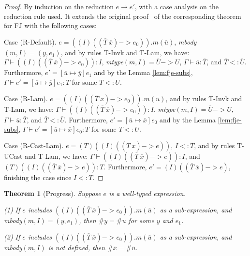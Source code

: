 \documentclass[tese,capa,english]{texufpel}
\newtheorem{theorem}{Theorem}
\begin{document}
\begin{proof}
By induction on the reduction $e \rightarrow e'$, with a case analysis on the reduction rule used. It extends the original proof~\cite{Igarashi:2001:FJM:503502.503505} of the corresponding theorem for FJ with the following cases:

\vspace{5pt}

Case (R-Default). $e = ((I)((\overline{T} ~ \overline{x}) -> e_0)).m(\overline{u})$, \emph{mbody}$(m, I) = (\overline{y}, e_1)$, and by rules {\footnotesize T-Invk} and {\footnotesize T-Lam}, we have: $\Gamma \vdash ((I)((\overline{T} ~ \overline{x}) -> e_0)): I$, \emph{mtype}$(m, I) = \overline{U} -> U$, $\Gamma \vdash \overline{u} : \overline{T}$, and $\overline{T} <: \overline{U}$. Furthermore, $e' = [\overline{u} \mapsto \overline{y}]e_1$ and by the Lemma \ref{lem:fje-subs}, $\Gamma \vdash e' = [\overline{u} \mapsto \overline{y}]e_1 : T$ for some $T <: U$.

Case (R-Lam). $e = ((I)((\overline{T} ~ \overline{x}) -> e_0)).m(\overline{u})$, and by rules {\footnotesize T-Invk} and {\footnotesize T-Lam}, we have: $\Gamma \vdash ((I)((\overline{T} ~ \overline{x}) -> e_0)): I$, \emph{mtype}$(m, I) = \overline{U} -> U$, $\Gamma \vdash \overline{u} : \overline{T}$, and $\overline{T} <: \overline{U}$. Furthermore, $e' = [\overline{u} \mapsto \overline{x}]e_0$ and by the Lemma \ref{lem:fje-subs}, $\Gamma \vdash e' = [\overline{u} \mapsto \overline{x}]e_0 : T$ for some $T <: U$.

Case (R-Cast-Lam). $e = (T)((I)((\overline{T} ~ \overline{x}) -> e))$, $I <: T$, and by rules {\footnotesize T-UCast} and {\footnotesize T-Lam}, we have: $\Gamma \vdash ((I)((\overline{T} ~ \overline{x}) -> e)): I$, and $(T)((I)((\overline{T} ~ \overline{x}) -> e)): T$. Furthermore, $e' = (I)((\overline{T} ~ \overline{x}) -> e)$, finishing the case since $I <: T$.
\end{proof}

\begin{theorem}[Progress]
\label{th:progress}
Suppose $e$ is a well-typed expression. 

(1) If $e$ includes $((I)((\overline{T} ~ \overline{x}) -> e_0)).m(\overline{u})$ as a sub-expression, and mbody$(m, I) = (\overline{y}, e_1)$, then $\#\overline{y} = \#\overline{u}$ for some $\overline{y}$ and $e_1$.

(2) If $e$ includes $((I)((\overline{T} ~ \overline{x}) -> e_0)).m(\overline{u})$ as a sub-expression, and mbody$(m, I)$ is not defined, then $\#\overline{x} = \#\overline{u}$.
\end{theorem}
\end{document}
